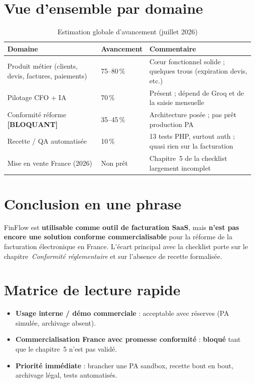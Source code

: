 \documentclass[11pt,a4paper]{report}
\begin{document}
\section{Vue d'ensemble par domaine}

\begin{table}[htbp]
    \centering
    \renewcommand{\arraystretch}{1.25}
    \begin{tabular}{@{}L{5.2cm}C{2.2cm}L{6.8cm}@{}}
        \toprule
        \textbf{Domaine} & \textbf{Avancement} & \textbf{Commentaire} \\
        \midrule
        Produit métier (clients, devis, factures, paiements) & 75--80\,\% & Cœur fonctionnel solide ; quelques trous (expiration devis, etc.) \\
        Pilotage CFO + IA & 70\,\% & Présent ; dépend de Groq et de la saisie mensuelle \\
        Conformité réforme \textbf{[BLOQUANT]} & 35--45\,\% & Architecture posée ; pas prêt production PA \\
        Recette / QA automatisée & 10\,\% & 13 tests PHP, surtout auth ; quasi rien sur la facturation \\
        Mise en vente France (2026) & Non prêt & Chapitre~5 de la checklist largement incomplet \\
        \bottomrule
    \end{tabular}
    \caption{Estimation globale d'avancement (juillet 2026)}
\end{table}

\section{Conclusion en une phrase}

FinFlow est \textbf{utilisable comme outil de facturation SaaS}, mais \textbf{n'est pas encore une solution conforme commercialisable} pour la réforme de la facturation électronique en France. L'écart principal avec la checklist porte sur le chapitre~\emph{Conformité réglementaire} et sur l'absence de recette formalisée.

\section{Matrice de lecture rapide}

\begin{itemize}[leftmargin=1.3em, itemsep=4pt]
    \item \textbf{Usage interne / démo commerciale} : acceptable avec réserves (PA simulée, archivage absent).
    \item \textbf{Commercialisation France avec promesse conformité} : \textbf{bloqué} tant que le chapitre~5 n'est pas validé.
    \item \textbf{Priorité immédiate} : brancher une PA sandbox, recette bout en bout, archivage légal, tests automatisés.
\end{itemize}
\end{document}
